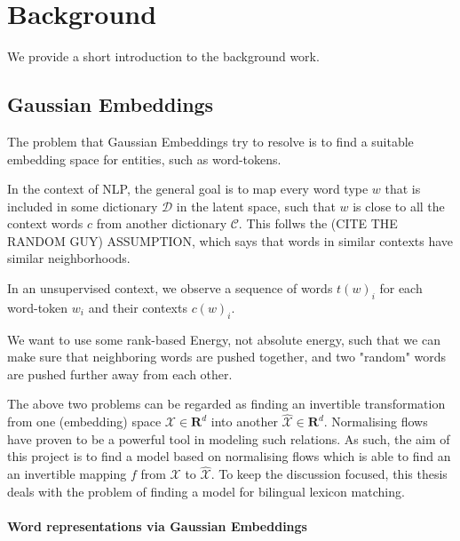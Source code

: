 \documentclass[a4paper,12pt,twoside,openright]{report}
\begin{document}
\chapter{Background} 

We provide a short introduction to the background work.


\section{Gaussian Embeddings}

The problem that Gaussian Embeddings try to resolve is to find a suitable embedding space for entities, such as word-tokens.

In the context of NLP, the general goal is to map every word type $w$ that is included in some dictionary $\mathcal{D}$ in the latent space, such that $w$ is close to all the context words $c$ from another dictionary $\mathcal{C}$.
This follws the (CITE THE RANDOM GUY) ASSUMPTION, which says that words in similar contexts have similar neighborhoods.

In an unsupervised context, we observe a sequence of words ${t(w)_i}$ for each word-token $w_i$ and their contexts $c(w)_i$.

We want to use some rank-based Energy, not absolute energy, such that we can make sure that neighboring words are pushed together, and two "random" words are pushed further away from each other.

The above two problems can be regarded as finding an invertible transformation from one (embedding) space $\mathcal{X} \in \mathbf{R}^d$ into another $\mathcal{\hat{X}} \in \mathbf{R}^d$. 
Normalising flows \cite{variational_inference_using_normalized_flows} \cite{nvp} have proven to be a powerful tool in modeling such relations.
As such, the aim of this project is to find a model based on normalising flows which is able to find an an invertible mapping $f$ from $\mathcal{X}$ to $\mathcal{\hat{X}}$.
To keep the discussion focused, this thesis deals with the problem of finding a model for bilingual lexicon matching.

\subsubsection{Word representations via Gaussian Embeddings}
\end{document}
